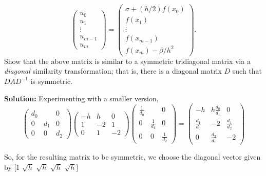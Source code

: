\documentclass[letterpaper,12pt]{article}
\begin{document}
\begin{enumerate}
\begin{enumerate}
\[\left( \begin{array}{c} u_0 \\ u_1 \\ \vdots \\ u_{m-1} \\ u_{m} \end{array} 
\right) =
\left( \begin{array}{c} \sigma + (h/2) f( x_0 ) \\ f( x_1 ) \\ \vdots \\ 
f( x_{m-1} ) \\ f( x_m ) - \beta / h^2 \end{array} \right) .
\]
Show that the above matrix is similar to a symmetric tridiagonal matrix 
via a {\em diagonal} similarity transformation; that is, there is a diagonal
matrix $D$ such that $D A D^{-1}$ is symmetric.

{\bf Solution:}
Experimenting with a smaller version,
\[
\left( \begin{array}{ccccc}
d_0 &   &     0       \\
0  & d_1 & 0        \\

0       & 0      & d_2 \end{array} \right) \left( \begin{array}{ccccc}
-h & h  &     0       \\
1  & -2 & 1        \\

0       & 1      & -2 \end{array} \right) 
\left( \begin{array}{ccccc}
\frac{1}{d_0} &   &     0       \\
0  & \frac{1}{d_1} & 0        \\

0       & 0      & \frac{1}{d_2} \end{array} \right) =
 \left( \begin{array}{ccccc}
-h & h\frac{d_0}{d_1}  &     0       \\
\frac{d_1}{d_0}  & -2 & \frac{d_1}{d_2}       \\

0       & \frac{d_2}{d_1}      & -2 \end{array} \right)\]

So, for the resulting matrix to be symmetric, we choose
the diagonal vector given by [1 $\sqrt{h}$ $\sqrt{h}$ $\sqrt{h}$  $\sqrt{h}$]


\end{enumerate}
\end{enumerate}
\end{document}
